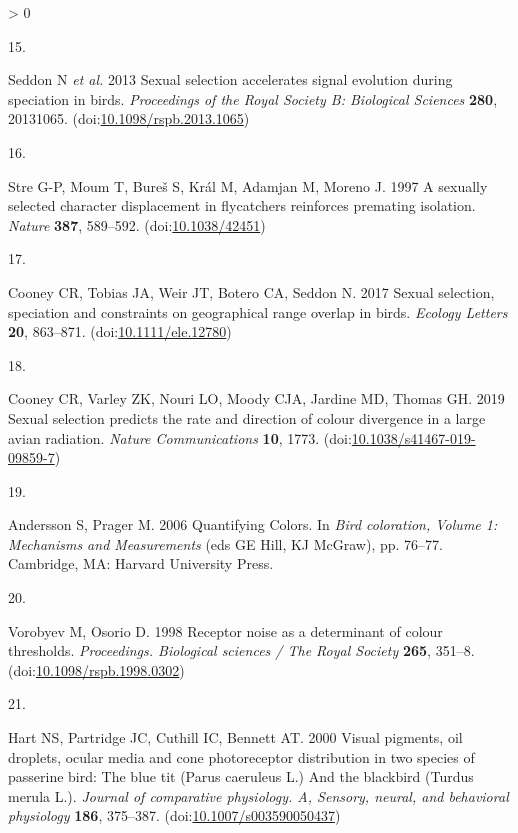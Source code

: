 \documentclass[
  a4paper,
]{article}
\newlength{\cslhangindent}
\newlength{\csllabelwidth}
\newenvironment{CSLReferences}[2] %
 {%
  \setlength{\parindent}{0pt}
  \ifodd #1 \everypar{\setlength{\hangindent}{\cslhangindent}}\ignorespaces\fi
  \ifnum #2 > 0
  \setlength{\parskip}{#2\baselineskip}
  \fi
 }%
 {}
\newcommand{\CSLLeftMargin}[1]{\parbox[t]{\csllabelwidth}{#1}}
\newcommand{\CSLRightInline}[1]{\parbox[t]{\linewidth - \csllabelwidth}{#1}\break}
\begin{document}
\begin{CSLReferences}{0}{0}
\leavevmode\hypertarget{ref-seddon2013}{}%
\CSLLeftMargin{15. }
\CSLRightInline{Seddon N \emph{et al.} 2013 Sexual selection accelerates
signal evolution during speciation in birds. \emph{Proceedings of the
Royal Society B: Biological Sciences} \textbf{280}, 20131065.
(doi:\href{https://doi.org/10.1098/rspb.2013.1065}{10.1098/rspb.2013.1065})}

\leavevmode\hypertarget{ref-stre1997}{}%
\CSLLeftMargin{16. }
\CSLRightInline{Stre G-P, Moum T, Bureš S, Král M, Adamjan M, Moreno J.
1997 A sexually selected character displacement in flycatchers
reinforces premating isolation. \emph{Nature} \textbf{387}, 589--592.
(doi:\href{https://doi.org/10.1038/42451}{10.1038/42451})}

\leavevmode\hypertarget{ref-cooney2017}{}%
\CSLLeftMargin{17. }
\CSLRightInline{Cooney CR, Tobias JA, Weir JT, Botero CA, Seddon N. 2017
Sexual selection, speciation and constraints on geographical range
overlap in birds. \emph{Ecology Letters} \textbf{20}, 863--871.
(doi:\href{https://doi.org/10.1111/ele.12780}{10.1111/ele.12780})}

\leavevmode\hypertarget{ref-cooney2019}{}%
\CSLLeftMargin{18. }
\CSLRightInline{Cooney CR, Varley ZK, Nouri LO, Moody CJA, Jardine MD,
Thomas GH. 2019 Sexual selection predicts the rate and direction of
colour divergence in a large avian radiation. \emph{Nature
Communications} \textbf{10}, 1773.
(doi:\href{https://doi.org/10.1038/s41467-019-09859-7}{10.1038/s41467-019-09859-7})}

\leavevmode\hypertarget{ref-andersson2006}{}%
\CSLLeftMargin{19. }
\CSLRightInline{Andersson S, Prager M. 2006 Quantifying {Colors}. In
\emph{Bird coloration, {Volume} 1: {Mechanisms} and {Measurements}} (eds
GE Hill, KJ McGraw), pp. 76--77. {Cambridge, MA}: {Harvard University
Press}. }

\leavevmode\hypertarget{ref-vorobyev1998}{}%
\CSLLeftMargin{20. }
\CSLRightInline{Vorobyev M, Osorio D. 1998 Receptor noise as a
determinant of colour thresholds. \emph{Proceedings. Biological sciences
/ The Royal Society} \textbf{265}, 351--8.
(doi:\href{https://doi.org/10.1098/rspb.1998.0302}{10.1098/rspb.1998.0302})}

\leavevmode\hypertarget{ref-hart2000}{}%
\CSLLeftMargin{21. }
\CSLRightInline{Hart NS, Partridge JC, Cuthill IC, Bennett AT. 2000
Visual pigments, oil droplets, ocular media and cone photoreceptor
distribution in two species of passerine bird: The blue tit ({Parus}
caeruleus {L}.) And the blackbird ({Turdus} merula {L}.). \emph{Journal
of comparative physiology. A, Sensory, neural, and behavioral
physiology} \textbf{186}, 375--387.
(doi:\href{https://doi.org/10.1007/s003590050437}{10.1007/s003590050437})}


\end{CSLReferences}
\end{document}
